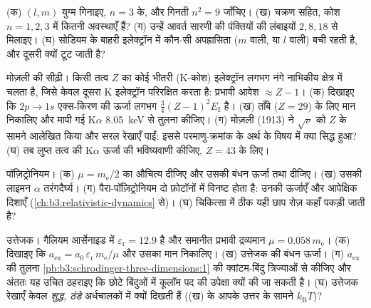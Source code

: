 \begin{exercise}[$\star$]\label{exo:b3:hydrogen-atom:4}
(क) $(l, m)$ युग्म गिनाइए, $n = 3$ के, और गिनती $n^2 =
9$ जाँचिए। (ख) चक्रण सहित, कोश $n = 1, 2, 3$ में कितनी अवस्थाएँ हैं? (ग)
उन्हें आवर्त सारणी की पंक्तियों की लंबाइयों $2, 8, 18$ से मिलाइए। (घ)
सोडियम के बाहरी इलेक्ट्रॉन में कौन-सी अपह्रासिता ($m$ वाली, या $l$
वाली) बची रहती है, और दूसरी क्यों टूट जाती है?
\end{exercise}

\begin{exercise}[$\star\star$]\label{exo:b3:hydrogen-atom:5}
मोज़ली की सीढ़ी। किसी तत्व $Z$ का कोई भीतरी (K-कोश) इलेक्ट्रॉन
लगभग नंगे नाभिकीय क्षेत्र में चलता है, जिसे केवल दूसरा K
इलेक्ट्रॉन परिरक्षित करता है: प्रभावी आवेश $\approx Z - 1$। (क) दिखाइए कि $2p \to 1s$
एक्स-किरण की ऊर्जा लगभग $\tfrac34(Z-1)^2E_{\text{I}}$ है। (ख)
ताँबे ($Z = 29$) के लिए मान निकालिए और मापी गई
K$\alpha$ \qty{8.05}{keV} से तुलना कीजिए। (ग) मोज़ली (1913) ने
$\sqrt{\nu}$ को $Z$ के सामने आलेखित किया और सरल रेखाएँ पाईं: इससे
परमाणु-क्रमांक के अर्थ के विषय में क्या सिद्ध हुआ? (घ) तब लुप्त तत्व की
K$\alpha$ ऊर्जा की भविष्यवाणी कीजिए, $Z = 43$ के लिए।
\end{exercise}

\begin{exercise}[$\star\star$]\label{exo:b3:hydrogen-atom:6}
पॉज़िट्रोनियम। (क) $\mu = m_{\text{e}}/2$ का औचित्य दीजिए और उसकी
बंधन ऊर्जा तथा  दीजिए। (ख) उसकी लाइमन $\alpha$ तरंगदैर्घ्य।
(ग) पैरा-पॉज़िट्रोनियम दो फ़ोटॉनों में विनष्ट होता है: उनकी ऊर्जाएँ
और आपेक्षिक दिशाएँ (\cref{ch:b3:relativistic-dynamics} से)।
(घ) चिकित्सा में ठीक यही छाप रोज़ कहाँ पकड़ी जाती है?
\end{exercise}

\begin{exercise}[$\star\star$]\label{exo:b3:hydrogen-atom:7}
उत्तेजक। गैलियम आर्सेनाइड में $\varepsilon_{\text{r}} = 12.9$ है और
समानीत प्रभावी द्रव्यमान $\mu = 0.058\,m_{\text{e}}$। (क) दिखाइए कि
$a_{\text{ex}} = a_0\,\varepsilon_{\text{r}}\,m_{\text{e}}/\mu$ और
उसका मान निकालिए। (ख) उत्तेजक की बंधन ऊर्जा। (ग)
$a_{\text{ex}}$ की तुलना \cref{pb:b3:schrodinger-three-dimensions:1}
की क्वांटम-बिंदु त्रिज्याओं से कीजिए और अंततः यह उचित ठहराइए कि
छोटे बिंदुओं में कूलॉम पद की उपेक्षा क्यों की जा सकती है। (घ) उत्तेजक
रेखाएँ केवल \emph{शुद्ध, ठंडे} अर्धचालकों में क्यों दिखती हैं
((ख) के आपके उत्तर के सामने $k_{\text{B}}T$)?
\end{exercise}

